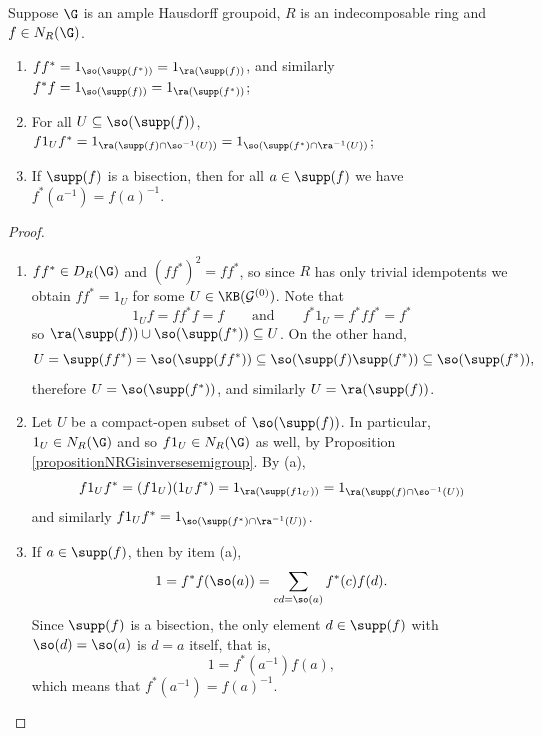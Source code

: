 \begin{lemma}[{\cite[Lemma 3.5]{MR3848066}}]\label{lemmanormalizerssteinbergalgebradiagonal2}
Suppose $\G$ is an ample Hausdorff groupoid, $R$ is an indecomposable ring and $f\in N_R(\G)$.
\begin{enumerate}
\item[(a)] $ff^*=1_{\so(\supp(f^*))}=1_{\ra(\supp(f))}$, and similarly $f^*f=1_{\so(\supp(f))}=1_{\ra(\supp(f^*))}$;
\item[(b)] For all $U\subseteq\so(\supp(f))$, $f1_Uf^*=1_{\ra(\supp(f)\cap\so^{-1}(U))}=1_{\so(\supp(f^*)\cap\ra^{-1}(U))}$;
\item[(c)] If $\supp(f)$ is a bisection, then for all $a\in\supp(f)$ we have $f^*(a^{-1})=f(a)^{-1}$.
\end{enumerate}
\end{lemma}
\begin{proof}
\begin{enumerate}
\item[(a)] $ff^*\in D_R(\G)$ and $(ff^*)^2=ff^*$, so since $R$ has only trivial idempotents we obtain $ff^*=1_U$ for some $U\in\KB(\mathcal{G}^{(0)})$. Note that
\[1_Uf=ff^*f=f\qquad\text{and}\qquad f^*1_U=f^*ff^*=f^*\]
so $\ra(\supp(f))\cup \so(\supp(f^*))\subseteq U$. On the other hand,
\[U=\supp(ff^*)=\so(\supp(ff^*))\subseteq \so(\supp(f)\supp(f^*))\subseteq \so(\supp(f^*)),\]
therefore $U=\so(\supp(f^*))$, and similarly $U=\ra(\supp(f))$.
%
\item[(b)] Let $U$ be a compact-open subset of $\so(\supp(f))$. In particular, $1_U\in N_R(\G)$ and so $f1_U\in N_R(\G)$ as well, by Proposition \ref{propositionNRGisinversesemigroup}. By (a),
\[f1_Uf^*=(f1_U)(1_U f^*)=1_{\ra(\supp(f1_U))}=1_{\ra(\supp(f)\cap\so^{-1}(U))}\]
and similarly $f1_Uf^*=1_{\so(\supp(f^*)\cap\ra^{-1}(U))}$.
%
\item[(c)] If $a\in\supp(f)$, then by item (a),
\[1=f^*f(\so(a))=\sum_{cd=\so(a)}f^*(c)f(d).\]
Since $\supp(f)$ is a bisection, the only element $d\in\supp(f)$ with $\so(d)=\so(a)$ is $d=a$ itself, that is,
\[1=f^*(a^{-1})f(a),\]
which means that $f^*(a^{-1})=f(a)^{-1}$.\qedhere
\end{enumerate}
\end{proof}

